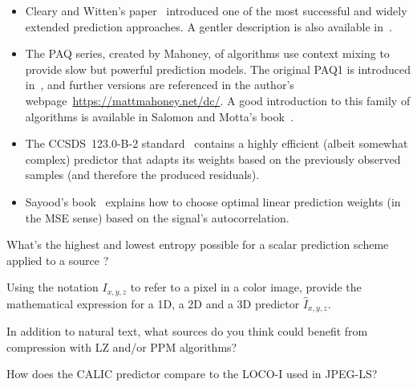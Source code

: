 \begin{itemize}
\item Cleary and Witten's paper~\cite{cleary_ppm} introduced one of the most successful and widely extended prediction approaches. A gentler description is also available in~\cite[\S 9.2]{mcanlis_understanding}.

\vspace{0.1cm}
\item The PAQ series, created by Mahoney, of algorithms use context mixing to provide slow but powerful prediction models. The original PAQ1 is introduced in~\cite{mahoney_paq1}, and further versions are referenced in the author's webpage~\url{https://mattmahoney.net/dc/}.
A good introduction to this family of algorithms is available in Salomon and Motta's book~\cite[\S 5.15]{salomon_handbook}.

\vspace{0.1cm}
\item The CCSDS~123.0-B-2 standard~\cite{ccsds123x0b2} contains a highly efficient (albeit somewhat complex) predictor that adapts
its weights based on the previously observed samples (and therefore the produced residuals).

\vspace{0.1cm}
\item Sayood's book~\cite[\S 8.6.2]{sayood_introduction} explains how to choose optimal linear prediction weights (in the MSE sense) based on the signal's autocorrelation.
\end{itemize}


\begin{exercise}
What's the highest and lowest entropy possible for a
scalar prediction scheme applied to a source \source?
\end{exercise}

\begin{exercise}
Using the notation $I_{x,y,z}$ to refer to a pixel in a color image,
provide the mathematical expression for a 1D, a 2D and a 3D predictor $\hat{I}_{x,y,z}$.
\end{exercise}

\begin{exercise}
In addition to natural text, what sources do you think could benefit from compression with LZ and/or PPM algorithms?
\end{exercise}

\begin{exercise}
How does the CALIC predictor compare to the LOCO-I used in JPEG-LS?
\end{exercise}

